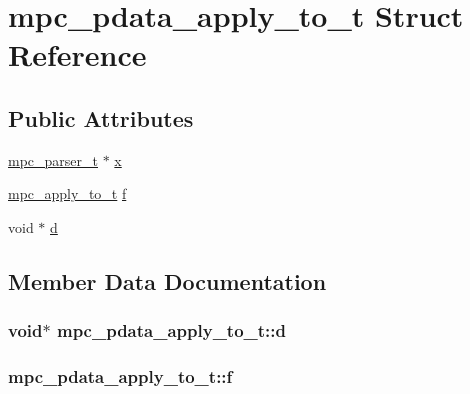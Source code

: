 \hypertarget{structmpc__pdata__apply__to__t}{}\section{mpc\+\_\+pdata\+\_\+apply\+\_\+to\+\_\+t Struct Reference}
\label{structmpc__pdata__apply__to__t}
\subsection*{Public Attributes}
\begin{DoxyCompactItemize}
\item 
\hyperlink{structmpc__parser__t}{mpc\+\_\+parser\+\_\+t} $\ast$ \hyperlink{structmpc__pdata__apply__to__t_a166928efe0b51b7dc9ca9229dbd701b2}{x}
\item 
\hyperlink{mpc_8h_ac294f1e648b792fbd5b10b399e4d7c3a}{mpc\+\_\+apply\+\_\+to\+\_\+t} \hyperlink{structmpc__pdata__apply__to__t_ae631e2c80ecb6ed0fcaa80abd1a71b1e}{f}
\item 
void $\ast$ \hyperlink{structmpc__pdata__apply__to__t_a434fc5ca7825e20809fad30fd698adc2}{d}
\end{DoxyCompactItemize}


\subsection{Member Data Documentation}
\hypertarget{structmpc__pdata__apply__to__t_a434fc5ca7825e20809fad30fd698adc2}{}
\subsubsection[{d}]{\setlength{\rightskip}{0pt plus 5cm}void$\ast$ mpc\+\_\+pdata\+\_\+apply\+\_\+to\+\_\+t\+::d}\label{structmpc__pdata__apply__to__t_a434fc5ca7825e20809fad30fd698adc2}
\hypertarget{structmpc__pdata__apply__to__t_ae631e2c80ecb6ed0fcaa80abd1a71b1e}{}
\subsubsection[{f}]{ mpc\+\_\+pdata\+\_\+apply\+\_\+to\+\_\+t\+::f}\label{structmpc__pdata__apply__to__t_ae631e2c80ecb6ed0fcaa80abd1a71b1e}
\hypertarget{structmpc__pdata__apply__to__t_a166928efe0b51b7dc9ca9229dbd701b2}{}
